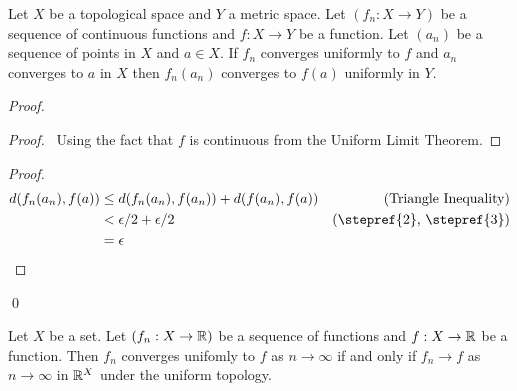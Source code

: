 \begin{proposition}
    Let $X$ be a topological space and $Y$ a metric space.  Let $(f_n : X \rightarrow Y)$ be a sequence of continuous functions and $f : X \rightarrow Y$ be a function.
    Let $(a_n)$ be a sequence of points in $X$ and $a \in X$. If $f_n$ converges uniformly to $f$ and $a_n$ converges to $a$ in $X$ then $f_n(a_n)$ converges to $f(a)$
    uniformly in $Y$.
\end{proposition}

\begin{proof}
    \pf
    \begin{proof}
        \pf\ Using the fact that $f$ is continuous from the Uniform Limit Theorem.
    \end{proof}
    \begin{proof}
        \pf
        \begin{align*}
            d(f_n(a_n),f(a)) & \leq d(f_n(a_n),f(a_n)) + d(f(a_n),f(a)) & (\text{Triangle Inequality}) \\
            & < \epsilon / 2 + \epsilon / 2 & (\text{\stepref{2}, \stepref{3}}) \\
            & = \epsilon
        \end{align*}
    \end{proof}
    \qed
\end{proof}

\begin{proposition}
    Let $X$ be a set. Let $(f_n : X \rightarrow \mathbb{R})$ be a sequence of functions and $f : X \rightarrow \mathbb{R}$ be a function.
    Then $f_n$ converges unifomly to $f$ as $n \rightarrow \infty$ if and only if $f_n \rightarrow f$ as $n \rightarrow \infty$
    in $\mathbb{R}^X$ under the uniform topology.
\end{proposition}

